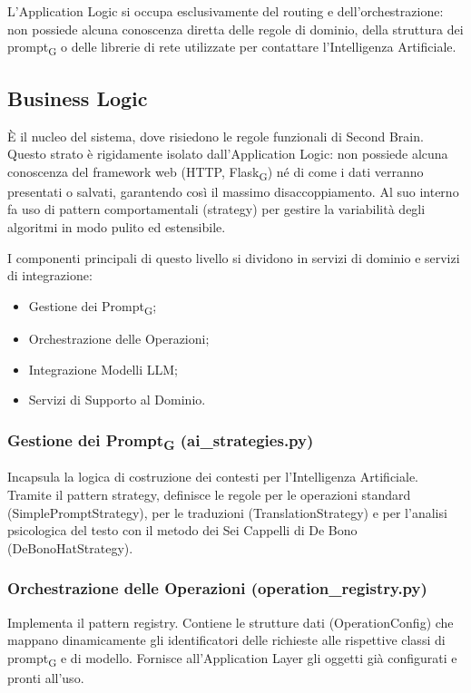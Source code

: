 \documentclass[11pt,a4paper]{article}
\newcommand{\gls}[1]{#1\textsubscript{G}}
\begin{document}
L'Application Logic si occupa esclusivamente del routing e dell'orchestrazione: non possiede alcuna conoscenza diretta delle regole di dominio, della struttura dei \gls{prompt} o delle librerie di rete utilizzate per contattare l'Intelligenza Artificiale.


\subsection{Business Logic}
È il nucleo del sistema, dove risiedono le regole funzionali di Second Brain. Questo strato è rigidamente isolato dall'Application Logic: non possiede alcuna conoscenza del framework web (HTTP, \gls{Flask}) né di come i dati verranno presentati o salvati, garantendo così il massimo disaccoppiamento. Al suo interno fa uso di pattern comportamentali (strategy) per gestire la variabilità degli algoritmi in modo pulito ed estensibile.

I componenti principali di questo livello si dividono in servizi di dominio e servizi di integrazione:
\begin{itemize}
    \item Gestione dei \gls{Prompt};
    \item Orchestrazione delle Operazioni;
    \item Integrazione Modelli LLM;
    \item Servizi di Supporto al Dominio.
\end{itemize}

\subsubsection{Gestione dei \gls{Prompt} (ai\_strategies.py)}
Incapsula la logica di costruzione dei contesti per l'Intelligenza Artificiale. Tramite il pattern strategy, definisce le regole per le operazioni standard (SimplePromptStrategy), per le traduzioni (TranslationStrategy) e per l’analisi psicologica del testo con il metodo dei Sei Cappelli di De Bono (DeBonoHatStrategy).

\subsubsection{Orchestrazione delle Operazioni (operation\_registry.py)}
Implementa il pattern registry. Contiene le strutture dati (OperationConfig) che mappano dinamicamente gli identificatori delle richieste alle rispettive classi di \gls{prompt} e di modello. Fornisce all'Application Layer gli oggetti già configurati e pronti all'uso.
\end{document}
